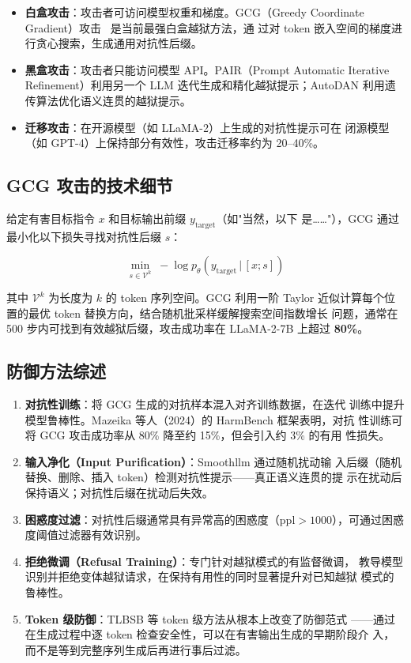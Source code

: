 \documentclass[12pt,a4paper,UTF8]{ctexart}
\begin{document}
\begin{itemize}[leftmargin=2em]
  \item \textbf{白盒攻击}：攻击者可访问模型权重和梯度。GCG（Greedy
    Coordinate Gradient）攻击~\cite{zou2023gcg} 是当前最强白盒越狱方法，通
    过对 token 嵌入空间的梯度进行贪心搜索，生成通用对抗性后缀。
  \item \textbf{黑盒攻击}：攻击者只能访问模型 API。PAIR（Prompt Automatic
    Iterative Refinement）利用另一个 LLM 迭代生成和精化越狱提示；AutoDAN
    利用遗传算法优化语义连贯的越狱提示。
  \item \textbf{迁移攻击}：在开源模型（如 LLaMA-2）上生成的对抗性提示可在
    闭源模型（如 GPT-4）上保持部分有效性，攻击迁移率约为 20--40\%。
\end{itemize}

\subsection{GCG 攻击的技术细节}

给定有害目标指令 $x$ 和目标输出前缀 $y_{\mathrm{target}}$（如"当然，以下
是……"），GCG 通过最小化以下损失寻找对抗性后缀 $s$：

\begin{equation}
  \min_{s\in\mathcal{V}^k}\;
    -\log p_\theta\!\left(y_{\mathrm{target}}\,\big|\,[x;s]\right)
\end{equation}

其中 $\mathcal{V}^k$ 为长度为 $k$ 的 token 序列空间。GCG 利用一阶 Taylor
近似计算每个位置的最优 token 替换方向，结合随机批采样缓解搜索空间指数增长
问题，通常在 500 步内可找到有效越狱后缀，攻击成功率在 LLaMA-2-7B 上超过
\textbf{80\%}。

\subsection{防御方法综述}

\begin{enumerate}[leftmargin=2em]
  \item \textbf{对抗性训练}：将 GCG 生成的对抗样本混入对齐训练数据，在迭代
    训练中提升模型鲁棒性。Mazeika 等人（2024）的 HarmBench 框架表明，对抗
    性训练可将 GCG 攻击成功率从 80\% 降至约 15\%，但会引入约 3\% 的有用
    性损失。
  \item \textbf{输入净化（Input Purification）}：Smoothllm 通过随机扰动输
    入后缀（随机替换、删除、插入 token）检测对抗性提示——真正语义连贯的提
    示在扰动后保持语义；对抗性后缀在扰动后失效。
  \item \textbf{困惑度过滤}：对抗性后缀通常具有异常高的困惑度（$\mathrm{ppl}
    > 1000$），可通过困惑度阈值过滤器有效识别。
  \item \textbf{拒绝微调（Refusal Training）}：专门针对越狱模式的有监督微调，
    教导模型识别并拒绝变体越狱请求，在保持有用性的同时显著提升对已知越狱
    模式的鲁棒性。
  \item \textbf{Token 级防御}：TLBSB 等 token 级方法从根本上改变了防御范式
    ——通过在生成过程中逐 token 检查安全性，可以在有害输出生成的早期阶段介
    入，而不是等到完整序列生成后再进行事后过滤。
\end{enumerate}
\end{document}
